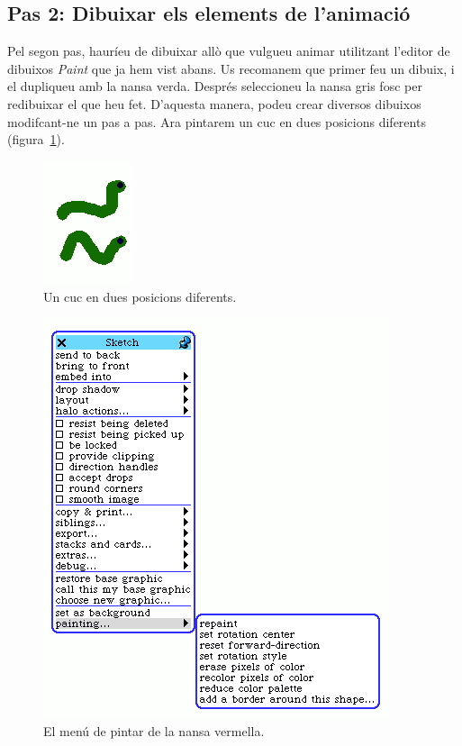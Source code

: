 \subsection{Pas 2: Dibuixar els elements de l'animació}
Pel segon pas, hauríeu de dibuixar allò que vulgueu animar utilitzant l'editor de dibuixos \emph{Paint} que ja hem vist abans. Us recomanem que primer feu un dibuix, i el dupliqueu amb la nansa verda. Després seleccioneu la nansa gris fosc per redibuixar el que heu fet. D'aquesta manera, podeu crear diversos dibuixos modifcant-ne un pas a pas. Ara pintarem un cuc en dues posicions diferents (figura~\ref{fig2420}).
\begin{figure}[h!]
\begin{center}
\includegraphics[scale=0.6]{Imatges/figura24-20}
\end{center}
\caption{Un cuc en dues posicions diferents.}
\label{fig2420}
\end{figure}
\begin{figure}[h!]
\begin{center}
\includegraphics[scale=0.4]{Imatges/figura24-21}
\end{center}
\caption{El menú de pintar de la nansa vermella.}
\label{fig2421}
\end{figure}

